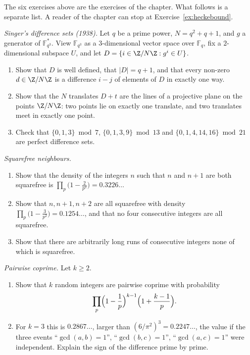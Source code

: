 The six exercises above are the exercises of the chapter. What follows is a separate list. A reader of the chapter can stop at Exercise~\ref{ex:heckebound}.

\begin{exercise}[$\star\star\star$]\label{pb:singer}
\emph{Singer's difference sets (1938).} Let $q$ be a prime power, $N=q^2+q+1$, and $g$ a generator of $\mathbb F_{q^3}^*$. View
$\mathbb F_{q^3}$ as a $3$-dimensional vector space over $\mathbb F_q$, fix a $2$-dimensional subspace $U$, and let
$D=\{i\in\Z/N\Z:g^i\in U\}$.
\begin{enumerate}[label=(\alph*)]
\item Show that $D$ is well defined, that $|D|=q+1$, and that every non-zero $d\in\Z/N\Z$ is a difference $i-j$ of elements of
$D$ in exactly one way.
\item Show that the $N$ translates $D+t$ are the lines of a projective plane on the points $\Z/N\Z$: two points lie on exactly one
translate, and two translates meet in exactly one point.
\item Check that $\{0,1,3\}\bmod7$, $\{0,1,3,9\}\bmod13$ and $\{0,1,4,14,16\}\bmod21$ are perfect difference sets.
\end{enumerate}
\end{exercise}

\begin{exercise}[$\star\star$]\label{pb:consecsqfree}
\emph{Squarefree neighbours.}
\begin{enumerate}[label=(\alph*)]
\item Show that the density of the integers $n$ such that $n$ and $n+1$ are both squarefree is
$\prod_p\bigl(1-\frac2{p^2}\bigr)=0.3226\ldots$
\item Show that $n,n+1,n+2$ are all squarefree with density $\prod_p\bigl(1-\frac3{p^2}\bigr)=0.1254\ldots$, and that no four
consecutive integers are all squarefree.
\item Show that there are arbitrarily long runs of consecutive integers none of which is squarefree.
\end{enumerate}
\end{exercise}

\begin{exercise}[$\star\star$]\label{pb:pairwise}
\emph{Pairwise coprime.} Let $k\ge2$.
\begin{enumerate}[label=(\alph*)]
\item Show that $k$ random integers are pairwise coprime with probability
\[
\prod_p\Bigl(1-\frac1p\Bigr)^{k-1}\Bigl(1+\frac{k-1}p\Bigr).
\]
\item For $k=3$ this is $0.2867\ldots$, larger than $(6/\pi^2)^3=0.2247\ldots$, the value if the three events
``$\gcd(a,b)=1$'', ``$\gcd(b,c)=1$'', ``$\gcd(a,c)=1$'' were independent. Explain the sign of the difference prime by prime.
\end{enumerate}
\end{exercise}

